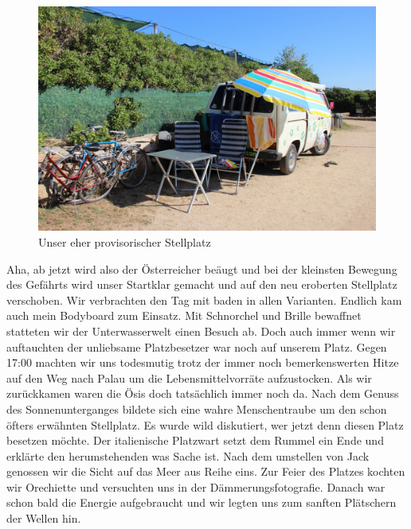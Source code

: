 \begin{figure}[hb]
    \centering
    \includegraphics[width=\textwidth]{../Bilder/Sardinien/17.jpg}
    \caption{Unser eher provisorischer Stellplatz}
    \label{img:Sardinien1}
\end{figure}

Aha, ab jetzt wird also der Österreicher beäugt und bei der kleinsten Bewegung des Gefährts wird unser Startklar gemacht und auf den neu eroberten Stellplatz verschoben.
Wir verbrachten den Tag mit baden in allen Varianten.
Endlich kam auch mein Bodyboard zum Einsatz.
Mit Schnorchel und Brille bewaffnet statteten wir der Unterwasserwelt einen Besuch ab.
Doch auch  immer wenn wir auftauchten der unliebsame Platzbesetzer war noch auf \glqq unserem\grqq{} Platz.
Gegen 17:00 machten wir uns todesmutig trotz der immer noch bemerkenswerten Hitze auf den Weg nach Palau um die Lebensmittelvorräte aufzustocken.
Als wir zurückkamen waren die Ösis doch tatsächlich immer noch da.
Nach dem Genuss des Sonnenunterganges bildete sich eine wahre Menschentraube um den schon öfters erwähnten Stellplatz.
Es wurde wild diskutiert, wer jetzt denn diesen Platz besetzen möchte.
Der italienische Platzwart setzt dem Rummel ein Ende und erklärte den herumstehenden was Sache ist.
Nach dem umstellen von Jack genossen wir die Sicht auf das Meer aus Reihe eins.
Zur Feier des Platzes kochten wir Orechiette und versuchten uns in der Dämmerungsfotografie.
Danach war schon bald die Energie aufgebraucht und wir legten uns zum sanften Plätschern der Wellen hin.

